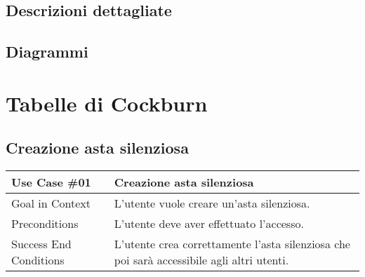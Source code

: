 \subsection{Descrizioni dettagliate}
\subsection{Diagrammi}

\newpage
\section{Tabelle di Cockburn}
\subsection{Creazione asta silenziosa}
\begin{table}[H]
	\renewcommand{\arraystretch}{1.3}
	\begin{tabularx}{\linewidth}{|p{120pt}|p{40pt}|X|X|}
		\hline \rowcolor[HTML]{DCDCDC}
		\textbf{\large\sffamily Use Case {\ttfamily \#}01} & \multicolumn{3}{p{367pt}|}{\textbf{\large\sffamily Creazione asta silenziosa}}                                                                                                                                                                     \\
		\hline Goal in Context                             & \multicolumn{3}{p{367pt}|}{L'utente vuole creare un'asta silenziosa.}                                                                                                                                                                              \\
		\hline Preconditions                               & \multicolumn{3}{p{367pt}|}{L'utente deve aver effettuato l'accesso.}                                                                                                                                                                               \\
		\hline Success End Conditions                      & \multicolumn{3}{p{367pt}|}{L'utente crea correttamente l'asta silenziosa che poi sarà accessibile agli altri  utenti.}                                                                                                                             \\


\end{tabularx}
\end{table}
